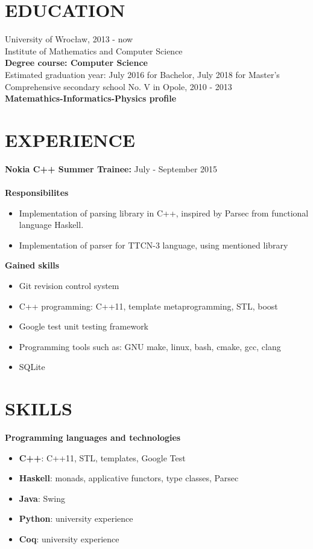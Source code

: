 \documentclass[line]{res}
\begin{document}
\address{ 
 Wrocław, przemek.lesniak1@gmail.com, \ tel.: 516 706 214}
 
\begin{resume}
\section{EDUCATION}

University of Wrocław, 2013 - now \\
Institute of Mathematics and Computer Science \\
\textbf{Degree course: Computer Science} \\
Estimated graduation year: July 2016 for Bachelor, July 2018 for Master's \\

Comprehensive secondary school No. V in Opole, 2010 - 2013 \\
\textbf{Matemathics-Informatics-Physics profile}

\section{EXPERIENCE}
	\textbf{Nokia C++ Summer Trainee: } July - September 2015 \\
	\\
	\textbf{Responsibilites } 
	\begin{itemize}
	\item{Implementation of parsing library in C++, inspired by Parsec from functional language Haskell. }
	\item{Implementation of parser for TTCN-3 language, using mentioned library}
	\end{itemize}
	\textbf{Gained skills}
	\begin{itemize}
	\item{Git revision control system}
	\item{C++ programming: C++11, template metaprogramming, STL, boost}
	\item{Google test unit testing framework }
	\item{Programming tools such as: GNU make, linux, bash, cmake, gcc, clang }
	\item{SQLite}
	\end{itemize}
	

\section{SKILLS}

\textbf{Programming languages and technologies}
\begin{itemize}
\item{\textbf{C++}: C++11, STL, templates, Google Test }
\item{\textbf{Haskell}: monads, applicative functors, type classes, Parsec }
\item{\textbf{Java}: Swing}
\item{\textbf{Python}: university experience }
\item{\textbf{Coq}: university experience }
\end{itemize}


\end{resume}
\end{document}
